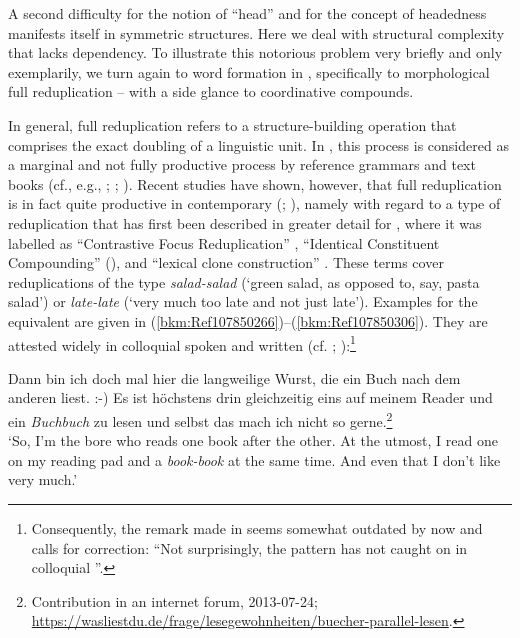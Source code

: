 \documentclass[output=paper
  ,nobabel
  ,draftmode
  ,colorlinks, citecolor=brown
]{langscibook}
\begin{document}
A second difficulty for the notion of ``head'' and for the concept of headedness manifests itself in
symmetric structures. Here we deal with structural complexity that lacks dependency. To illustrate
this notorious problem very briefly and only exemplarily, we turn again to word formation in ,
specifically to morphological full reduplication – with a side glance to coordinative compounds.

In general, full reduplication refers to a structure-building operation that comprises the exact
doubling of a linguistic unit. In , this process is considered as a marginal and not fully
productive process by reference grammars and text books (cf., e.g., \citealt[104]{OrtnerOrtner1984};
\citealt[43]{Lohde2006}; \citealt[94--96]{FleischerBarz2012}). Recent studies have shown, however,
that full reduplication is in fact quite productive in contemporary 
(\citealt{Finkbeiner2014}; \citealt{Freywald2015}), namely with regard to a type of reduplication
that has first been described in greater detail for , where it was labelled as ``Contrastive
Focus Reduplication'' \citep{GhomeshiEtAl2004}, ``Identical Constituent Compounding''
(\citealt{Hohenhaus1996,Hohenhaus2004}), and ``lexical clone construction'' \citep{Horn2018}. These terms
cover reduplications of the type \emph{salad-salad} (`green salad, as opposed to, say, pasta salad')
or \emph{late-late} (`very much too late and not just late'). Examples for the  equivalent are
given in (\ref{bkm:Ref107850266})–(\ref{bkm:Ref107850306}). They are attested widely in colloquial
spoken and written  (cf. \citealt{Finkbeiner2014};
\citealt{Freywald2015}):\footnote{Consequently, the remark made in 
  \citet[202]{StolzStrohUrdze2011} seems somewhat outdated by now and calls for correction: ``Not surprisingly,
  the pattern has not caught on in colloquial ''.}


\ea
\label{bkm:Ref107850266}\label{ex:key:6}%
       Dann bin ich doch mal hier die langweilige Wurst, die ein Buch nach dem anderen liest. :-) Es ist höchstens drin gleichzeitig eins auf meinem Reader und ein \emph{Buchbuch} zu lesen und selbst das mach ich nicht so gerne.\footnote{Contribution in an internet forum, 2013-07-24; \url{https://wasliestdu.de/frage/lesegewohnheiten/buecher-parallel-lesen}.}\\
`So, I'm the bore who reads one book after the other. At the utmost, I read one on my reading pad and a \emph{book-book} at the same time. And even that I don't like very much.'
\z
\end{document}
